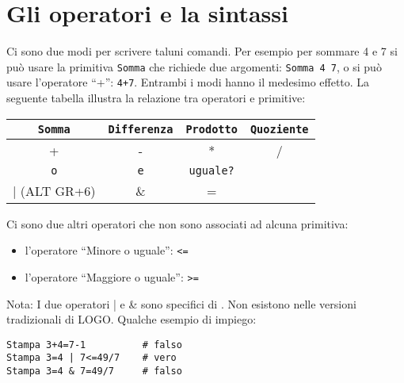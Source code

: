 \section{Gli operatori e la sintassi}

Ci sono due modi per scrivere taluni comandi. Per esempio per sommare 4 e 7 si può usare la primitiva \texttt{Somma} che richiede due argomenti: \texttt{Somma 4 7}, o si può usare l'operatore ``+'': \texttt{4+7}. Entrambi i modi hanno il medesimo effetto. La seguente tabella illustra la relazione tra operatori e primitive:
\begin{center}
	\begin{tabular}{|c|c|c|c|}
		\hline 
		\texttt{Somma}&		\texttt{Differenza}&		\texttt{Prodotto}&		\texttt{Quoziente}\\
		\hline
		+ &		- &		{*} &		/ \\
		\hline
		\texttt{o}&		\texttt{e}&		\texttt{uguale?}&\\
		\hline
		| (ALT GR+6) &		\&&		=&\\
		\hline
	\end{tabular}
\end{center}
\vspace{0.25cm}
Ci sono due altri operatori che non sono associati ad alcuna primitiva:
\begin{itemize}
	\item l'operatore ``Minore o uguale'': \texttt{<=}
	\item l'operatore ``Maggiore o uguale'': \texttt{>=}
\end{itemize}

Nota: I due operatori | e \& sono specifici di \xlogo. Non esistono nelle versioni tradizionali di LOGO. Qualche esempio di impiego:
\begin{lstlisting}
Stampa 3+4=7-1 			# falso
Stampa 3=4 | 7<=49/7	# vero
Stampa 3=4 & 7=49/7		# falso
\end{lstlisting}
